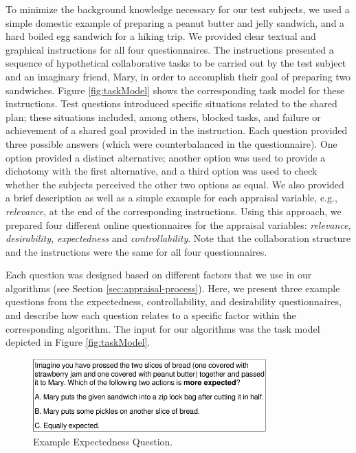 To minimize the background knowledge necessary for our test subjects, we used a
simple domestic example of preparing a peanut butter and jelly sandwich, and a
hard boiled egg sandwich for a hiking trip. We provided clear textual and
graphical instructions for all four questionnaires. The instructions presented
a sequence of hypothetical collaborative tasks to be carried out by the test
subject and an imaginary friend, Mary, in order to accomplish their goal of
preparing two sandwiches. Figure \ref{fig:taskModel} shows the corresponding
task model for these instructions. Test questions introduced specific situations
related to the shared plan; these situations included, among others, blocked
tasks, and failure or achievement of a shared goal provided in the instruction.
Each question provided three possible answers (which were counterbalanced in
the questionnaire). One option provided a distinct alternative; another option
was used to provide a dichotomy with the first alternative, and a third option
was used to check whether the subjects perceived the other two options as equal.
We also provided a brief description as well as a simple example for each
appraisal variable, e.g., \textit{relevance}, at the end of the corresponding
instructions. Using this approach, we prepared four different online
questionnaires for the appraisal variables: \textit{relevance, desirability,
expectedness} and \textit{controllability}. Note that the collaboration
structure and the instructions were the same for all four questionnaires.

Each question was designed based on different factors that we use in our
algorithms (see Section \ref{sec:appraisal-process}). Here, we present three
example questions from the expectedness, controllability, and desirability
questionnaires, and describe how each question relates to a specific factor
within the corresponding algorithm. The input for our algorithms was the task
model depicted in Figure \ref{fig:taskModel}.

\begin{figure}[tbh]
  \vspace{-1mm}
  \centering
  \includegraphics[width=0.8\textwidth]{figure/question-sample-croped.pdf}
  \caption{{\fontsize{9}{9}\selectfont Example Expectedness Question.}}
  \label{fig:qs1}
  \vspace{-2mm}
\end{figure}

